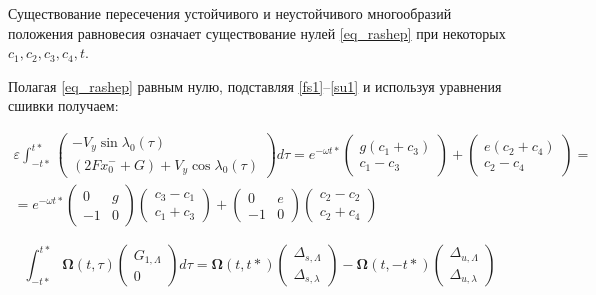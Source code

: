 Существование пересечения устойчивого и неустойчивого многообразий положения равновесия означает существование нулей \eqref{eq_rashep} при некоторых $c_1,c_2,c_3,c_4, t$.

Полагая \eqref{eq_rashep} равным нулю, подставляя \eqref{fs1}--\eqref{su1} и используя уравнения сшивки получаем:

\begin{multline}
\varepsilon \int_{-t*}^{t*} \begin{pmatrix} -V_y \sin \lambda_0(\tau) \\ (2F x_0^- + G) + V_y \cos \lambda_0(\tau) \end{pmatrix} d\tau
=
e^{-\omega t*} \begin{pmatrix}
g(c_1+c_3) \\ c_1-c_3
\end{pmatrix}
+
\begin{pmatrix}
e(c_2+c_4) \\ c_2-c_4
\end{pmatrix}
=\\[1.5ex]
=e^{-\omega t*} \begin{pmatrix}
0 & g \\ -1 & 0
\end{pmatrix}
\begin{pmatrix}
c_3-c_1 \\ c_1+c_3
\end{pmatrix}
+
\begin{pmatrix}
0 & e \\ -1 & 0
\end{pmatrix}
\begin{pmatrix}
c_2-c_2 \\ c_2+c_4
\end{pmatrix}
\end{multline}

\begin{equation}
\int_{-t*}^{t*} \mathbf{\Omega}(t, \tau) \begin{pmatrix} G_{1, \Lambda} \\ 0 \end{pmatrix} d\tau
=\mathbf{\Omega}(t, t*) \begin{pmatrix} \Delta_{s,\Lambda} \\ \Delta_{s,\lambda} \end{pmatrix}
- \mathbf{\Omega}(t, -t*) \begin{pmatrix} \Delta_{u,\Lambda} \\ \Delta_{u,\lambda} \end{pmatrix}
\end{equation}

